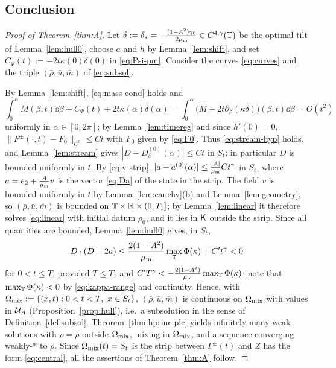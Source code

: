 \subsection{Conclusion}
\begin{proof}[Proof of Theorem~\ref{thm:A}]
Let $\delta:=\delta_*=-\frac{(1-A^2)\gamma_0}{2\mu_{\mathrm m}}\in C^{4,\gamma}(\mathbb{T})$ be the optimal tilt of Lemma~\ref{lem:hull0}, choose $a$ and $h$ by Lemma~\ref{lem:shift}, and set
$C_\Psi(t):=-2t\kappa(0)\delta(0)$ in \eqref{eq:Psi-pm}. Consider the curves \eqref{eq:curves} and the triple $(\bar\rho,\bar u,\bar m)$ of \eqref{eq:subsol}.

By Lemma~\ref{lem:shift}, \eqref{eq:mass-cond} holds and
\[
\int_0^\alpha M(\beta,t)\dd\beta+C_\Psi(t)+2t\kappa(\alpha)\delta(\alpha)=\int_0^\alpha\big(M+2t\partial_\beta(\kappa\delta)\big)(\beta,t)\dd\beta=O(t^2)
\]
uniformly in $\alpha\in[0,2\pi]$; by Lemma~\ref{lem:timereg} and since $h'(0)=0$, $\|F^\pm(\cdot,t)-F_0\|_{C^0}\le Ct$ with $F_0$ given by \eqref{eq:F0}. Thus \eqref{eq:stream-hyp} holds, and
Lemma~\ref{lem:stream} gives $|D-D^{(0)}_{\delta}(\alpha)|\le Ct$ in $S_t$; in particular $D$ is bounded uniformly in $t$. By \eqref{eq:v-strip}, $|a-a^{(0)}(\alpha)|\le\frac{|A|}{\mu_{\mathrm m}}Ct^\gamma$
in $S_t$, where $a=e_2+\frac A{\mu_{\mathrm m}} v$ is the vector \eqref{eq:Da} of the state in the strip. The field $v$ is bounded uniformly in $t$ by Lemma~\ref{lem:cauchy}(b) and
Lemma~\ref{lem:geometry}, so $(\bar\rho,\bar u,\bar m)$ is bounded on $\mathbb{T}\times\mathbb{R}\times(0,T_1]$; by Lemma~\ref{lem:linear} it therefore solves \eqref{eq:linear} with initial datum $\rho_0$, and it
lies in $\mathsf{K}$ outside the strip. Since all quantities are bounded, Lemma~\ref{lem:hull0} gives, in $S_t$,
\[
D\cdot(D-2a)\le\frac{2(1-A^2)}{\mu_{\mathrm m}}\max_{\mathbb{T}}\Phi(\kappa)+C't^\gamma<0
\]
for $0<t\le T$, provided $T\le T_1$ and $C'T^\gamma<-\frac{2(1-A^2)}{\mu_{\mathrm m}}\max_{\mathbb{T}}\Phi(\kappa)$; note that $\max_{\mathbb{T}}\Phi(\kappa)<0$ by \eqref{eq:kappa-range} and continuity. Hence, with
$\Omega_{\rm mix}:=\{(x,t):0<t<T,\ x\in S_t\}$, $(\bar\rho,\bar u,\bar m)$ is continuous on $\Omega_{\rm mix}$ with values in $\mathcal{U}_A$ (Proposition~\ref{prop:hull}), i.e.\ a subsolution in the sense of
Definition~\ref{def:subsol}. Theorem~\ref{thm:hprinciple} yields infinitely many weak solutions with $\rho=\bar\rho$ outside $\Omega_{\rm mix}$, mixing in $\Omega_{\rm mix}$, and a sequence converging weakly-$*$
to $\bar\rho$. Since $\Omega_{\rm mix}(t)=S_t$ is the strip between $\Gamma^\pm(t)$ and $Z$ has the form \eqref{eq:central}, all the assertions of Theorem~\ref{thm:A} follow.
\end{proof}

